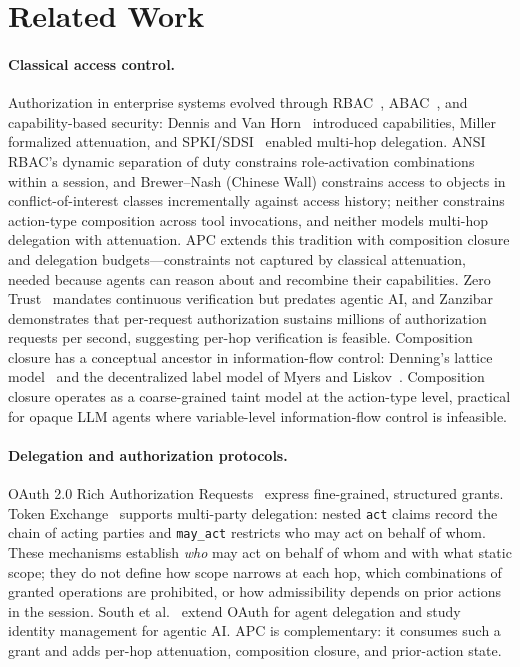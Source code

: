 \documentclass[sigconf,nonacm]{acmart}
\begin{document}
\section{Related Work}\label{sec:related}

\paragraph{Classical access control.} Authorization in enterprise systems evolved through RBAC~\cite{sandhu1996}, ABAC~\cite{hu2014}, and capability-based security: Dennis and Van Horn~\cite{dennis1966} introduced capabilities, Miller~\cite{miller2006} formalized attenuation, and SPKI/SDSI~\cite{ellison1999} enabled multi-hop delegation. ANSI RBAC's dynamic separation of duty constrains role-activation combinations within a session, and Brewer--Nash (Chinese Wall) constrains access to objects in conflict-of-interest classes incrementally against access history; neither constrains action-type composition across tool invocations, and neither models multi-hop delegation with attenuation. APC extends this tradition with composition closure and delegation budgets---constraints not captured by classical attenuation, needed because agents can reason about and recombine their capabilities. Zero Trust~\cite{nist800207} mandates continuous verification but predates agentic AI, and Zanzibar~\cite{pang2019} demonstrates that per-request authorization sustains millions of authorization requests per second, suggesting per-hop verification is feasible. Composition closure has a conceptual ancestor in information-flow control: Denning's lattice model~\cite{denning1976} and the decentralized label model of Myers and Liskov~\cite{myersliskov1997, myersliskov2000}. Composition closure operates as a coarse-grained taint model at the action-type level, practical for opaque LLM agents where variable-level information-flow control is infeasible.

\paragraph{Delegation and authorization protocols.} OAuth 2.0 Rich Authorization Requests~\cite{rfc9396} express fine-grained, structured grants. Token Exchange~\cite{rfc8693} supports multi-party delegation: nested \texttt{act} claims record the chain of acting parties and \texttt{may\_act} restricts who may act on behalf of whom. These mechanisms establish \emph{who} may act on behalf of whom and with what static scope; they do not define how scope narrows at each hop, which combinations of granted operations are prohibited, or how admissibility depends on prior actions in the session. South et al.~\cite{south2025, south2025b} extend OAuth for agent delegation and study identity management for agentic AI. APC is complementary: it consumes such a grant and adds per-hop attenuation, composition closure, and prior-action state.
\end{document}
